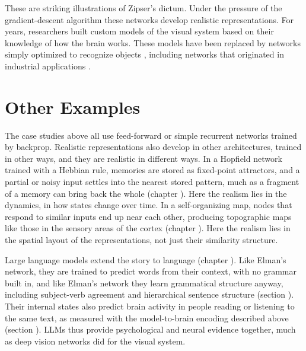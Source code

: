 These are striking illustrations of Zipser's dictum. Under the pressure of the gradient-descent algorithm these networks develop realistic representations. For years, researchers built custom models of the visual system based on their knowledge of how the brain works. These models have been replaced by networks simply optimized to recognize objects \cite{yamins2014performance}, including networks that originated in industrial applications \cite{cadieu2014deep}.



\section{Other Examples}

The case studies above all use feed-forward or simple recurrent networks trained by backprop. Realistic representations also develop in other architectures, trained in other ways, and they are realistic in different ways. In a Hopfield network trained with a Hebbian rule, memories are stored as fixed-point attractors, and a partial or noisy input settles into the nearest stored pattern, much as a fragment of a memory can bring back the whole (chapter ). Here the realism lies in the dynamics, in how states change over time. In a self-organizing map, nodes that respond to similar inputs end up near each other, producing topographic maps like those in the sensory areas of the cortex (chapter ). Here the realism lies in the spatial layout of the representations, not just their similarity structure.

Large language models extend the story to language (chapter ). Like Elman's network, they are trained to predict words from their context, with no grammar built in, and like Elman's network they learn grammatical structure anyway, including subject-verb agreement and hierarchical sentence structure (section ). Their internal states also predict brain activity in people reading or listening to the same text, as measured with the model-to-brain encoding described above (section ). LLMs thus provide psychological and neural evidence together, much as deep vision networks did for the visual system.

